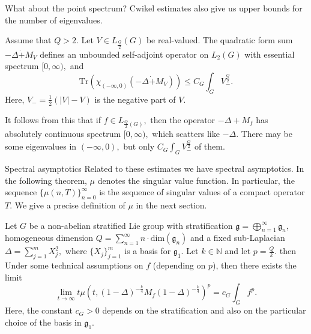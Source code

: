 \documentclass{beamer}
\numberwithin{equation}{section}
\theoremstyle{plain}
\theoremstyle{plain}
\theoremstyle{definition}
\theoremstyle{plain}
\theoremstyle{plain}
\theoremstyle{definition}
\newcommand{\Tr}{\mathrm{Tr}}
\newcommand{\gf}{\mathfrak{g}}
\begin{document}
\begin{frame}{What about the point spectrum?}
  Cwikel estimates also give us upper bounds for the number of eigenvalues.
\begin{theorem}\label{CLR_theorem}
    Assume that $Q>2.$ Let $V \in L_{\frac{Q}{2}}(G)$ be real-valued. The quadratic form sum $-\Delta\dot{+}M_V$
    defines an unbounded self-adjoint operator on $L_2(G)$ with essential spectrum $[0,\infty),$ and
    \[
        \Tr(\chi_{(-\infty,0)}(-\Delta\dot{+}M_V)) \leq C_{G}\int_{G} V_-^{\frac{Q}{2}}.
    \]
    Here, $V_- = \frac{1}{2}(|V|-V)$ is the negative part of $V.$
\end{theorem}
{\color{red}
It follows from this that if $f \in L_{\frac{Q}{2}(G)},$ then the operator $-\Delta+M_f$ has absolutely continuous spectrum $[0,\infty),$ which scatters like $-\Delta.$
There may be some eigenvalues in $(-\infty,0),$ but only $C_G\int_G V_-^{\frac{Q}{2}}$ of them.
}
\end{frame}




\begin{frame}{Spectral asymptotics}
Related to these estimates we have spectral asymptotics. In the following theorem, $\mu$ denotes the singular value function. In particular, the sequence $\{\mu(n,T)\}_{n=0}^\infty$ is the sequence of singular values of a compact operator $T.$ We give a precise definition of $\mu$ in the next section.
\begin{theorem}\label{main_asymptotic_formula}
Let $G$ be a non-abelian stratified Lie group with stratification $\gf = \bigoplus_{n=1}^\infty \gf_n,$ homogeneous dimension $Q = \sum_{n=1}^\infty n\cdot \mathrm{dim}(\gf_n)$
and a fixed sub-Laplacian $\Delta = \sum_{j=1}^m X_j^2,$ where $\{X_j\}_{j=1}^m$ is a basis for $\gf_1.$ Let $k\in\mathbb{N}$ and let $p=\frac{Q}{k}.$
then {\color{red} Under some technical assumptions on $f$ (depending on $p$),}
then there exists the limit
$$\lim_{t\to\infty} t\mu(t,(1-\Delta)^{-\frac{k}{4}}M_f(1-\Delta)^{-\frac{k}{4}})^p=c_G\int_G f^p.$$
Here, the constant $c_G>0$ depends on the stratification and also on the particular choice of the basis in $\gf_1.$
\end{theorem}
\end{frame}
\end{document}
